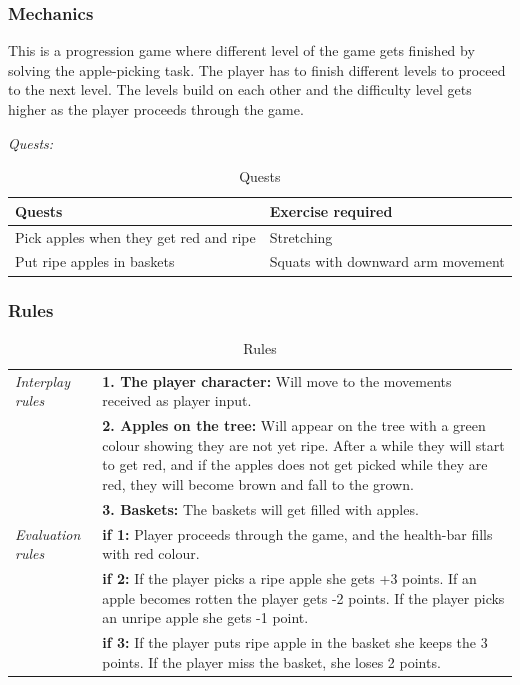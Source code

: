 \subsubsection{Mechanics} 
This is a progression game where different level of the game gets finished by solving the apple-picking task. The player has to finish different levels to proceed to the next level. The levels build on each other and the difficulty level gets higher as the player proceeds through the game.

\emph{Quests:} 

\begin{table}
\begin{tabular}{|>{\raggedright}p{}|p{}|}
\hline
\textbf{Quests} & \textbf{Exercise required}  \\ \hline
Pick apples when they get red and ripe & Stretching  \\ \hline
Put ripe apples in baskets &  Squats with downward arm movement \\ \hline
\end{tabular}
\caption[Quests in the "Apple Picking" game]{Quests}
\label{tab:quests2}
\end{table}

\subsubsection{Rules} 

\begin{table} [H]
\centering
\begin{tabular}{|p{}|p{}|}
\hline
\emph{Interplay rules} & \textbf{1. The player character:} Will move to the movements received as player input. \\ \cline{2-2}
 &  \textbf{2. Apples on the tree:} Will appear on the tree with a green colour showing they are not yet ripe. After a while they will start to get red, and if the apples does not get picked while they are red, they will become brown and fall to the grown. \\ \cline{2-2}
& \textbf{3. Baskets:} The baskets will get filled with apples. \\ \hline
\emph{Evaluation rules} & \textbf{if 1:} Player proceeds through the game, and the health-bar fills with red colour.\\ \cline{2-2}
 & \textbf{if 2:} If the player picks a ripe apple she gets +3 points. If an apple becomes rotten the player gets -2 points. If the player picks an unripe apple she gets -1 point. \\ \cline{2-2}
& \textbf{if 3:} If the player puts ripe apple in the basket she keeps the 3 points. If the player miss the basket, she loses 2 points.  \\ \hline
\end{tabular}
\caption[Rules for the "Apple Picking" game]{Rules}
\label{tab:rules2}
\end{table}  

